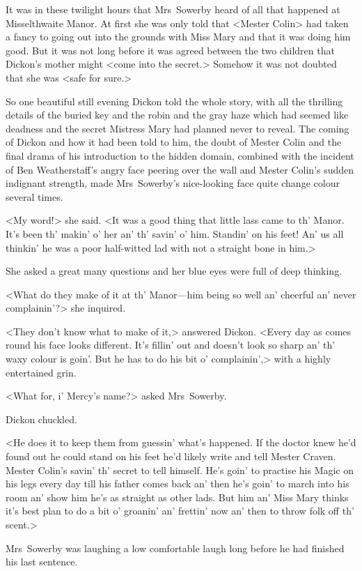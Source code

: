 It was in these twilight hours that Mrs~Sowerby heard of all that happened at Misselthwaite Manor. At first she was only told that <Mester Colin> had taken a fancy to going out into the grounds with Miss Mary and that it was doing him good. But it was not long before it was agreed between the two children that Dickon's mother might <come into the secret.> Somehow it was not doubted that she was <safe for sure.>

So one beautiful still evening Dickon told the whole story, with all the thrilling details of the buried key and the robin and the gray haze which had seemed like deadness and the secret Mistress Mary had planned never to reveal. The coming of Dickon and how it had been told to him, the doubt of Mester Colin and the final drama of his introduction to the hidden domain, combined with the incident of Ben Weatherstaff's angry face peering over the wall and Mester Colin's sudden indignant strength, made Mrs~Sowerby's nice-looking face quite change colour several times.

<My word!> she said. <It was a good thing that little lass came to th' Manor. It's been th' makin' o' her an' th' savin' o' him. Standin' on his feet! An' us all thinkin' he was a poor half-witted lad with not a straight bone in him.>

She asked a great many questions and her blue eyes were full of deep thinking.

<What do they make of it at th' Manor—him being so well an' cheerful an' never complainin'?> she inquired.

<They don't know what to make of it,> answered Dickon. <Every day as comes round his face looks different. It's fillin' out and doesn't look so sharp an' th' waxy colour is goin'. But he has to do his bit o' complainin',> with a highly entertained grin.

<What for, i' Mercy's name?> asked Mrs~Sowerby.

Dickon chuckled.

<He does it to keep them from guessin' what's happened. If the doctor knew he'd found out he could stand on his feet he'd likely write and tell Mester Craven. Mester Colin's savin' th' secret to tell himself. He's goin' to practise his Magic on his legs every day till his father comes back an' then he's goin' to march into his room an' show him he's as straight as other lads. But him an' Miss Mary thinks it's best plan to do a bit o' groanin' an' frettin' now an' then to throw folk off th' scent.>

Mrs~Sowerby was laughing a low comfortable laugh long before he had finished his last sentence.

